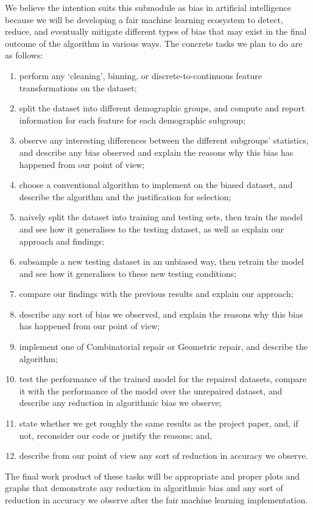 \documentclass[conference]{IEEEtran}
\begin{document}
We believe the intention suits this submodule as bias in artificial intelligence because we will be developing a fair machine learning ecosystem
to detect, reduce, and eventually mitigate different types of bias that may exist in the final outcome of the algorithm in various ways. The concrete tasks we plan to do are as follows:
\begin{enumerate}
    \item perform any `cleaning', binning, or discrete-to-continuous feature transformations on the dataset;
    \item split the dataset into different demographic groups, and compute and report information for each feature for each demographic subgroup;
    \item observe any interesting differences between the different subgroups’ statistics, and describe any bias observed and explain the reasons why this bias has happened from our point of view;
    \item choose a conventional algorithm to implement on the biased dataset, and describe the algorithm and the justification for selection;
    \item naively split the dataset into training and testing sets, then train the model and see how it generalises to the testing dataset, as well as explain our approach and findings;
    \item subsample a new testing dataset in an unbiased way, then retrain the model and see how it generalises to these new testing conditions; 
    \item compare our findings with the previous results and explain our approach;
    \item describe any sort of bias we observed, and explain the reasons why this bias has happened from our point of view;
    \item implement one of Combinatorial repair or Geometric repair, and describe the algorithm;
    \item test the performance of the trained model for the repaired datasets, compare it with the performance of the model over the unrepaired dataset, and describe any reduction in algorithmic bias we observe;
    \item state whether we get roughly the same results as the project paper, and, if not, reconsider our code or justify the reasons; and,
    \item describe from our point of view any sort of reduction in accuracy we observe.
\end{enumerate}
The final work product of these tasks will be appropriate and proper plots and graphs that demonstrate any reduction in algorithmic bias and any sort of reduction in accuracy we observe after the fair machine learning implementation.
\end{document}

